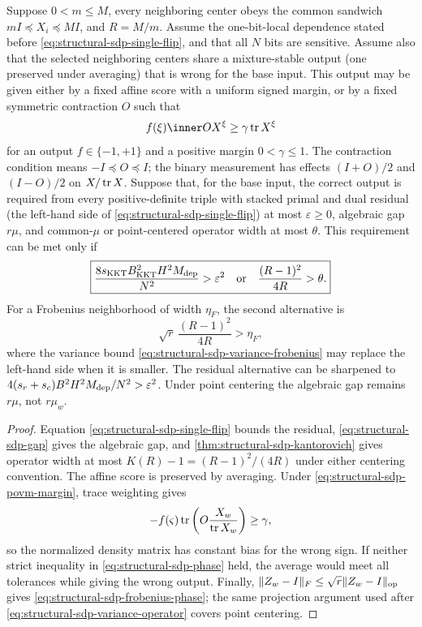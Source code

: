 \begin{proposition}
\label{prop:structural-sdp-phase}
Suppose $0<m\leq M$, every neighboring center obeys the common sandwich
$mI\preceq X_i\preceq MI$, and $R=M/m$.  Assume the one-bit-local dependence
stated before \eqref{eq:structural-sdp-single-flip}, and that all $N$ bits
are sensitive.  Assume also that the selected neighboring centers share a
mixture-stable output (one preserved under averaging) that is wrong for the
base input.  This output may be given either by a fixed affine score
with a uniform signed margin, or by a fixed symmetric contraction $O$ such
that
\begin{equation}
 f(\xi)\inner O{X^\xi}\geq\gamma\tr X^\xi               \label{eq:structural-sdp-povm-margin}
\end{equation}
for an output $f\in\{-1,+1\}$ and a positive margin $0<\gamma\leq1$.
The contraction condition means $-I\preceq O\preceq I$; the binary
measurement has effects $(I+O)/2$ and $(I-O)/2$ on $X/\operatorname{tr} X$.
Suppose that, for the base input, the correct output is required from every
positive-definite triple with stacked primal and dual residual (the
left-hand side of \eqref{eq:structural-sdp-single-flip}) at most
$\varepsilon\geq0$, algebraic gap $r\mu$, and common-$\mu$ or
point-centered operator width at most $\theta$.  This requirement can be
met only if
\begin{equation}
 \boxed{
 \frac{8s_{\rm KKT}B_{\rm KKT}^2H^2M_{\rm dep}}{N^2}>\varepsilon^2
 \quad\text{or}\quad
 \frac{(R-1)^2}{4R}>\theta.}                             \label{eq:structural-sdp-phase}
\end{equation}
For a Frobenius neighborhood of width $\eta_F$, the second alternative is
\begin{equation}
 \sqrt r\,\frac{(R-1)^2}{4R}>\eta_F,                     \label{eq:structural-sdp-frobenius-phase}
\end{equation}
where the variance bound \eqref{eq:structural-sdp-variance-frobenius} may
replace the left-hand side when it is smaller.
The residual alternative can be sharpened to
$4(s_r+s_c)B^2H^2M_{\rm dep}/N^2>\varepsilon^2$.
Under point centering the algebraic gap remains $r\mu$, not $r\mu_w$.
\end{proposition}

\begin{proof}
Equation \eqref{eq:structural-sdp-single-flip} bounds the residual,
\eqref{eq:structural-sdp-gap} gives the algebraic gap, and
\cref{thm:structural-sdp-kantorovich} gives operator width at most
$K(R)-1=(R-1)^2/(4R)$ under either centering convention.  The affine score is
preserved by averaging.  Under \eqref{eq:structural-sdp-povm-margin}, trace
weighting gives
\[
 -f(\varsigma)\operatorname{tr}\left(O\frac{X_w}{\operatorname{tr} X_w}\right)\geq\gamma,
\]
so the normalized density matrix has constant bias for the wrong sign.  If
neither strict inequality in \eqref{eq:structural-sdp-phase} held, the
average would meet all tolerances while giving the wrong output.  Finally,
$\lVert Z_w-I\rVert_F\leq\sqrt r\lVert Z_w-I\rVert_{\rm op}$ gives
\eqref{eq:structural-sdp-frobenius-phase}; the same projection argument used
after \eqref{eq:structural-sdp-variance-operator} covers point centering.
\end{proof}

